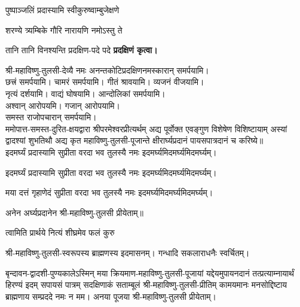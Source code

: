 {पुष्पाञ्जलिं प्रदास्यामि स्वीकुरुष्वाम्बुजेक्षणे}

{शरण्ये त्र्यम्बिके गौरि नारायणि नमोऽस्तु ते}


{तानि तानि विनश्यन्ति प्रदक्षिण-पदे पदे}
\textbf{प्रदक्षिणं कृत्वा।}
\medskip

श्री-महाविष्णु-तुलसी-देव्यै नमः अनन्तकोटिप्रदक्षिणनमस्कारान् समर्पयामि।\\
छत्त्रं समर्पयामि। चामरं समर्पयामि। गीतं श्रावयामि। व्यजनं वीजयामि।\\
नृत्यं दर्शयामि। वाद्यं घोषयामि। आन्दोलिकां समर्पयामि।\\
अश्वान् आरोपयमि। गजान् आरोपयामि।\\
समस्त राजोपचारान् समर्पयामि।\\


ममोपात्त-समस्त-दुरित-क्षयद्वारा श्रीपरमेश्वरप्रीत्यर्थम् अद्य पूर्वोक्त एवङ्गुण विशेषेण विशिष्टायाम् अस्यां द्वादश्यां शुभतिथौ अद्य कृत महाविष्णु-तुलसी-पूजान्ते क्षीरार्घ्यप्रदानं पायसपात्रदानं च करिष्ये॥\\

{इदमर्घ्यं प्रदास्यामि सुप्रीता वरदा भव}
\hfill तुलस्यै नमः इदमर्घ्यमिदमर्घ्यमिदमर्घ्यम्।

{इदमर्घ्यं प्रदास्यामि सुप्रीता वरदा भव}
\hfill तुलस्यै नमः इदमर्घ्यमिदमर्घ्यमिदमर्घ्यम्।

{मया दत्तं गृहाणेदं सुप्रीता वरदा भव}
\hfill तुलस्यै नमः इदमर्घ्यमिदमर्घ्यमिदमर्घ्यम्।

अनेन अर्घ्यप्रदानेन श्री-महाविष्णु-तुलसी प्रीयेताम्॥\\


{त्वामिति प्रार्थये नित्यं शीघ्रमेव फलं कुरु}

श्री-महाविष्णु-तुलसी-स्वरूपस्य ब्राह्मणस्य इदमासनम्। गन्धादि सकलाराधनैः स्वर्चितम्।

\hiranyagarbha

बृन्दावन-द्वादशी-पुण्यकालेऽस्मिन् मया क्रियमाण-महाविष्णु-तुलसी-पूजायां यद्देयमुपायनदानं तत्प्रत्याम्नायार्थं
हिरण्यं इदम् सपायसं पात्रम् सदक्षिणाकं सताम्बूलं श्री-महाविष्णु-तुलसी-प्रीतिम्
कामयमानः मनसोद्दिष्टाय ब्राह्मणाय सम्प्रददे नमः न मम।
अनया पूजया श्री-महाविष्णु-तुलसी प्रीयेताम्।

